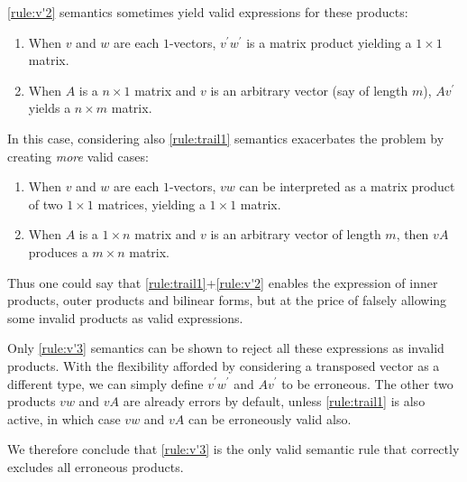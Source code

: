 \ref{rule:v'2} semantics sometimes yield valid expressions for these products:
%
\begin{enumerate}
\item When $v$ and $w$ are each $1$-vectors, $v^\prime w^\prime$ is a matrix
product yielding a $1\times 1$ matrix.
\item When $A$ is a $n\times 1$ matrix and $v$ is an arbitrary vector (say of
length $m$), $Av^\prime$ yields a $n\times m$ matrix.
\end{enumerate}
%
In this case, considering also \ref{rule:trail1} semantics
exacerbates the problem by creating \textit{more} valid cases:
%
\begin{enumerate}
\item When $v$ and $w$ are each $1$-vectors, $vw$ can be interpreted as a
matrix product of two $1\times1$ matrices, yielding a $1\times1$ matrix.
\item When $A$ is a $1\times n$ matrix and $v$ is an arbitrary vector of length
$m$, then $vA$ produces a $m\times n$ matrix.
\end{enumerate}
%
Thus one could say that \ref{rule:trail1}+\ref{rule:v'2} enables the expression
of inner products, outer products and bilinear forms, but at the price of
falsely allowing some invalid products as valid expressions.

Only \ref{rule:v'3} semantics can be shown to reject all these expressions as
invalid products. With the flexibility afforded by considering a transposed
vector as a different type, we can simply define $v^\prime w^\prime$ and
$Av^\prime$ to be erroneous. The other two products $vw$ and $vA$ are already
errors by default, unless \ref{rule:trail1} is also active, in which case $vw$
and $vA$ can be erroneously valid also.

We therefore conclude that \ref{rule:v'3} is the only valid semantic rule that
correctly excludes all erroneous products.



